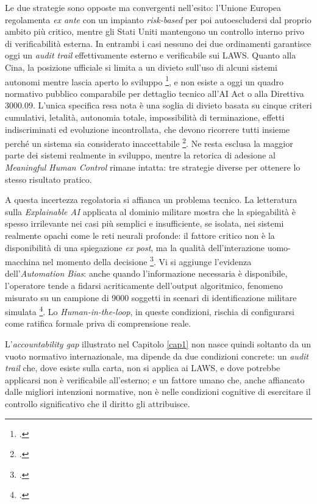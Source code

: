 \documentclass[a4paper,12pt]{report}
\begin{document}
Le due strategie sono opposte ma convergenti nell'esito: l'Unione Europea
regolamenta \textit{ex ante} con un impianto \textit{risk-based} per poi
autoescludersi dal proprio ambito più critico, mentre gli Stati Uniti mantengono
un controllo interno privo di verificabilità esterna. In entrambi i casi nessuno
dei due ordinamenti garantisce oggi un \textit{audit trail} effettivamente
esterno e verificabile sui LAWS. Quanto alla Cina, la posizione ufficiale si
limita a un divieto sull'uso di alcuni sistemi autonomi mentre lascia aperto lo
sviluppo \footcite{wareham_2020}, e non esiste a oggi un quadro normativo
pubblico comparabile per dettaglio tecnico all'AI Act o alla Direttiva 3000.09.
L'unica specifica resa nota è una soglia di divieto basata su cinque criteri
cumulativi, letalità, autonomia totale, impossibilità di terminazione, effetti
indiscriminati ed evoluzione incontrollata, che devono ricorrere tutti insieme
perché un sistema sia considerato inaccettabile \footcite{mako_2026_china_mhc}.
Ne resta esclusa la maggior parte dei sistemi realmente in sviluppo, mentre la
retorica di adesione al \textit{Meaningful Human Control} rimane intatta: tre
strategie diverse per ottenere lo stesso risultato pratico.

A questa incertezza regolatoria si affianca un problema tecnico. La letteratura
sulla \textit{Explainable AI} applicata al dominio militare mostra che la
spiegabilità è spesso irrilevante nei casi più semplici e insufficiente, se
isolata, nei sistemi realmente opachi come le reti neurali profonde: il fattore
critico non è la disponibilità di una spiegazione \textit{ex post}, ma la qualità
dell'interazione uomo-macchina nel momento della decisione
\footcite{wood_2024_xai}. Vi si aggiunge l'evidenza dell'\textit{Automation
Bias}: anche quando l'informazione necessaria è disponibile, l'operatore tende a
fidarsi acriticamente dell'output algoritmico, fenomeno misurato su un campione
di 9000 soggetti in scenari di identificazione militare simulata
\footcite{horowitz_kahn_2024}. Lo \textit{Human-in-the-loop}, in queste
condizioni, rischia di configurarsi come ratifica formale priva di comprensione
reale.

L'\textit{accountability gap} illustrato nel Capitolo \ref{cap1} non nasce quindi
soltanto da un vuoto normativo internazionale, ma dipende da due condizioni
concrete: un \textit{audit trail} che, dove esiste sulla carta, non si applica ai
LAWS, e dove potrebbe applicarsi non è verificabile all'esterno; e un fattore
umano che, anche affiancato dalle migliori intenzioni normative, non è nelle
condizioni cognitive di esercitare il controllo significativo che il diritto gli
attribuisce.
\end{document}
